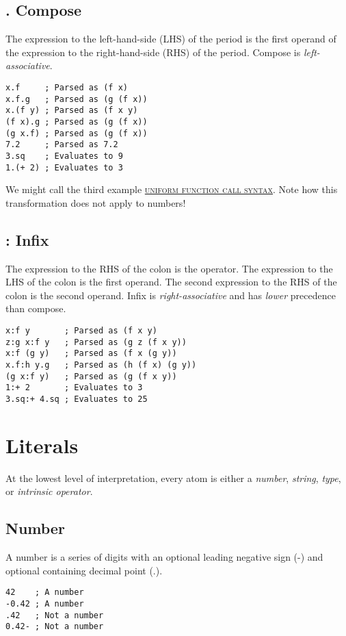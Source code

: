 \documentclass[twoside=false, numbers=noenddot]{scrbook}
\newcommand{\noun}[1]{\textsc{#1}}
\newcommand{\cref}[3]{\href{#1}{\noun{#2}}\cite{#3}}
\begin{document}
\section{. Compose}
The expression to the left-hand-side (LHS) of the period is the first operand of the expression to the right-hand-side (RHS) of the period.
Compose is \emph{left-associative}.

\begin{verbatim}
x.f     ; Parsed as (f x)
x.f.g   ; Parsed as (g (f x))
x.(f y) ; Parsed as (f x y)
(f x).g ; Parsed as (g (f x))
(g x.f) ; Parsed as (g (f x))
7.2     ; Parsed as 7.2
3.sq    ; Evaluates to 9
1.(+ 2) ; Evaluates to 3
\end{verbatim}

We might call the third example \cref{http://www.drdobbs.com/cpp/uniform-function-call-syntax/232700394}{uniform function call syntax}{Bright:2012:UFC}.
Note how this transformation does not apply to numbers!

\section{: Infix}
The expression to the RHS of the colon is the operator.
The expression to the LHS of the colon is the first operand.
The second expression to the RHS of the colon is the second operand.
Infix is \emph{right-associative} and has \emph{lower} precedence than compose.

\begin{verbatim}
x:f y       ; Parsed as (f x y)
z:g x:f y   ; Parsed as (g z (f x y))
x:f (g y)   ; Parsed as (f x (g y))
x.f:h y.g   ; Parsed as (h (f x) (g y))
(g x:f y)   ; Parsed as (g (f x y))
1:+ 2       ; Evaluates to 3
3.sq:+ 4.sq ; Evaluates to 25
\end{verbatim}

\chapter{Literals}
At the lowest level of interpretation, every atom is either a \emph{number}, \emph{string}, \emph{type}, or \emph{intrinsic operator}.

\section{Number}
A number is a series of digits with an optional leading negative sign (-) and optional containing decimal point (.).

\begin{verbatim}
42    ; A number
-0.42 ; A number
.42   ; Not a number
0.42- ; Not a number
\end{verbatim}
\end{document}
